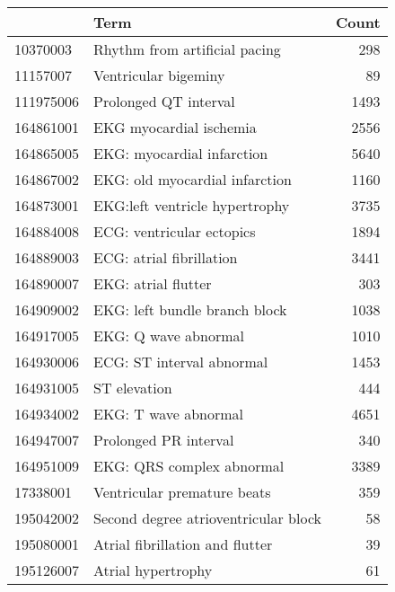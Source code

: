 \begin{tabular}{llr}
\toprule
{} &                                               Term &  Count \\
\midrule
10370003       &                      Rhythm from artificial pacing &    298 \\
11157007       &                               Ventricular bigeminy &     89 \\
111975006      &                              Prolonged QT interval &   1493 \\
164861001      &                            EKG myocardial ischemia &   2556 \\
164865005      &                         EKG: myocardial infarction &   5640 \\
164867002      &                     EKG: old myocardial infarction &   1160 \\
164873001      &                     EKG:left ventricle hypertrophy &   3735 \\
164884008      &                          ECG: ventricular ectopics &   1894 \\
164889003      &                           ECG: atrial fibrillation &   3441 \\
164890007      &                                EKG: atrial flutter &    303 \\
164909002      &                      EKG: left bundle branch block &   1038 \\
164917005      &                               EKG: Q wave abnormal &   1010 \\
164930006      &                          ECG: ST interval abnormal &   1453 \\
164931005      &                                       ST elevation &    444 \\
164934002      &                               EKG: T wave abnormal &   4651 \\
164947007      &                              Prolonged PR interval &    340 \\
164951009      &                          EKG: QRS complex abnormal &   3389 \\
17338001       &                        Ventricular premature beats &    359 \\
195042002      &               Second degree atrioventricular block &     58 \\
195080001      &                    Atrial fibrillation and flutter &     39 \\
195126007      &                                 Atrial hypertrophy &     61 \\

\end{tabular}
